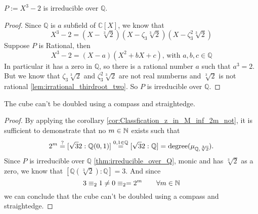 \begin{lemma}
    $P := X^3 - 2$ is irreducible over $\mathbb{Q}$.
\label{thm:irreducible_over_Q}
\end{lemma}
\begin{proof}
    Since $\mathbb{Q}$ is $a$ subfield of $\mathbb{C} [X]$, we know that
    \begin{equation*}
        X^3 - 2 = (X - \sqrt[3]{2})(X -\zeta_3 \sqrt[3]{2})(X -\zeta_3^2 \sqrt[3]{2})
    \end{equation*}
    Suppose $P$ is Rational, then
    \begin{equation*}
        X^3 - 2 = (X - a)(X^2 + bX + c)\text{, with } a, b, c \in \mathbb{Q}
    \end{equation*}
    In particular it has a zero in $\mathbb{Q}$, so there is a rational number $a$ such that $a^3 = 2$.\newline
    But we know that $\zeta_3 \sqrt[3]{2}$ and $\zeta_3^2 \sqrt[3]{2}$ are not real numberns and $\sqrt[3]{2}$ is not rational \ref{lem:irrational_thirdroot_two}.
    So $P$ is irreducible over $\mathbb{Q}$.
\end{proof}

\begin{theorem}
    The cube can't be doubled using a compass and straightedge.
\end{theorem}
\begin{proof}
    By applying the corollary \ref{cor:Classfication_z_in_M_inf_2m_not}, it is sufficient to demonstrate that no $m\in \mathbb{N}$ exists such that
    $$2^m\overset{?}{=}[\sqrt{3}{2}:\mathbb{Q}({0,1})]\overset{0,1\in\mathbb{Q}}{=} [\sqrt{3}{2}:\mathbb{Q}] = \text{degree}(\mu_{\mathbb{Q},\sqrt[3]{2}}).$$
    Since $P$ is irreducible over $\mathbb{Q}$ \ref{thm:irreducible_over_Q}, monic and has $\sqrt[3]{2}$ as a zero, we know that $[\mathbb{Q}(\sqrt[3]{2}):\mathbb{Q}] = 3$.
    And since $$ 3  \equiv_2 1 \neq 0  \equiv_2 = 2^m \qquad\forall m \in \mathbb{N}$$
    we can conclude that the cube can't be doubled using a compass and straightedge.
    
\end{proof}

